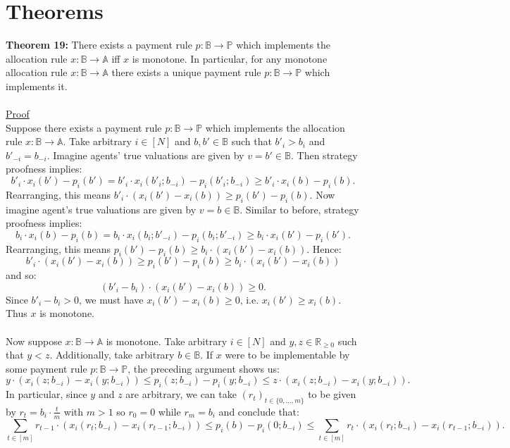 \documentclass[11pt]{article}
\theoremstyle{definition}
\theoremstyle{plain}
\begin{document}
\section{Theorems}
\noindent\textbf{Theorem 19:} There exists a payment rule $p: \mathbb{B} \to
\mathbb{P}$ which implements the allocation rule $x: \mathbb{B} \to \mathbb{A}$ iff
$x$ is monotone. In particular, for any monotone allocation rule $x: \mathbb{B} \to
\mathbb{A}$ there exists a unique payment rule $p: \mathbb{B} \to \mathbb{P}$ which
implements it.
\\
\\
\underline{Proof}
\\
Suppose there exists a payment rule $p: \mathbb{B} \to \mathbb{P}$ which implements
the allocation rule $x: \mathbb{B} \to \mathbb{A}$. Take arbitrary $i \in [N]$ and
$b,b' \in \mathbb{B}$ such that $b'_i > b_i$ and $b'_{-i}=b_{-i}$. Imagine agents'
true valuations are given by $v=b' \in \mathbb{B}$. Then strategy proofness
implies:
$$b'_i \cdot x_i(b')-p_i(b') =b'_i \cdot x_i(b'_i;b_{-i})-p_i(b'_i;b_{-i}) \geq
b'_i \cdot x_i(b)-p_i(b).$$
Rearranging, this means $b'_i \cdot (x_i(b')-x_i(b)) \geq p_i(b')-p_i(b)$.
\newpage
\noindent Now imagine agent's true valuations are given by $v=b \in \mathbb{B}$.
Similar to before, strategy proofness implies:
$$b_i \cdot x_i(b) - p_i(b)=b_i \cdot x_i(b_i; b'_{-i})-p_i(b_i; b'_{-i}) \geq b_i
\cdot x_i(b')-p_i(b').$$
Rearranging, this means $p_i(b')-p_i(b) \geq b_i \cdot (x_i(b')-x_i(b))$. Hence:
$$b'_i \cdot (x_i(b')-x_i(b)) \geq p_i(b')-p_i(b) \geq b_i \cdot (x_i(b')-x_i(b)) $$
and so:
$$(b'_i-b_i) \cdot (x_i(b')-x_i(b)) \geq 0.$$
Since $b'_i -b_i>0$, we must have $x_i(b')-x_i(b) \geq 0$, i.e. $x_i(b') \geq
x_i(b)$. Thus $x$ is monotone.
\\
\\
Now suppose $x: \mathbb{B} \to \mathbb{A}$ is monotone. Take arbitrary $i \in [N]$
and $y,z \in \mathbb{R}_{\geq 0}$ such that $y < z$. Additionally, take arbitrary
$b \in \mathbb{B}$. If $x$ were to be implementable by some payment rule $p:
\mathbb{B} \to \mathbb{P}$, the preceding argument shows us:
$$y \cdot (x_i(z;b_{-i})-x_i(y;b_{-i})) \leq p_i(z;b_{-i})-p_i(y;b_{-i}) \leq z
\cdot (x_i(z;b_{-i})-x_i(y;b_{-i})).$$
In particular, since $y$ and $z$ are arbitrary, we can take $(r_t)_{t \in
\{0,...,m\}}$ to be given by $r_t=b_i \cdot \frac{t}{m}$ with $m>1$ so $r_0=0$
while $r_m=b_i$ and conclude that:
$$\sum_{t \in [m]} r_{t-1} \cdot (x_i(r_t;b_{-i})-x_i(r_{t-1};b_{-i})) \leq
p_i(b)-p_i(0;b_{-i}) \leq \sum_{t \in [m]} r_t \cdot (x_i(r_t;b_{-i})-
x_i(r_{t-1};b_{-i})).$$
\end{document}

